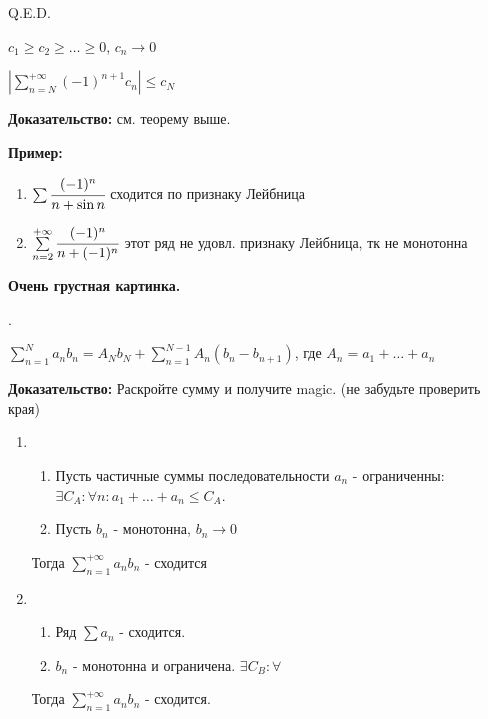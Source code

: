 \hfill Q.E.D.


$c_1\geq c_2 \geq \ldots \geq 0  $, $c_n\rightarrow 0 $

$|\sum\limits_{n=N}^{+\infty} (-1)^{n+1}c_n|\leq c_N$

\textbf{Доказательство:} см. теорему выше.

\textbf{Пример:}
\begin{enumerate}
    \item $\sum \cfrac{(-1)^n}{n + \sin n}$ сходится по признаку Лейбница
    \item $\sum\limits_{n=2}^{+\infty}\cfrac{(-1)^n}{n +(-1)^n}$ этот ряд не удовл. признаку Лейбница, тк не монотонна 
\end{enumerate}

\textbf{Очень грустная картинка.}

.

$\sum\limits_{n=1}^{N} a_n b_n = A_N b_N + \sum\limits_{n=1}^{N-1}A_n(b_n-b_{n+1})$, где $A_n = a_1 + \ldots + a_n$

\textbf{Доказательство:} Раскройте сумму и получите magic. (не забудьте проверить края)


\begin{enumerate}
    \item
    \begin{enumerate}
        \item  Пусть частичные суммы последовательности $a_n$ - ограниченны: $\exists C_A: \forall n: a_1 + \ldots + a_n \leq C_A$.
         \item Пусть $b_n$ - монотонна, $b_n\rightarrow 0 $
    
    \end{enumerate}
     Тогда $\sum\limits_{n=1}^{+\infty}a_nb_n$ - сходится
  
   \item
   \begin{enumerate}
       \item Ряд $\sum a_n$ - сходится.
        \item $b_n$ - монотонна и ограничена. $\exists C_B: \forall $
   \end{enumerate}
    Тогда $\sum\limits_{n=1}^{+\infty}a_nb_n$ - сходится.
   
\end{enumerate}

